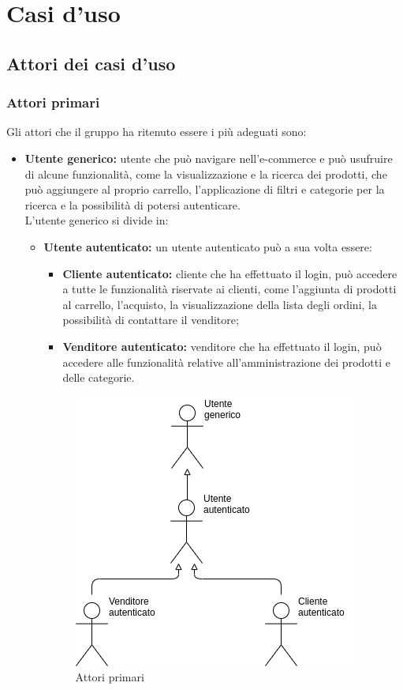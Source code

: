 \section{Casi d'uso}
\subsection{Attori dei casi d'uso}
\subsubsection{Attori primari}
Gli attori che il gruppo ha ritenuto essere i più adeguati sono:
\begin{itemize}
    \item \textbf{Utente generico:} utente che può navigare nell'e-commerce e può usufruire di alcune funzionalità, come la visualizzazione e la ricerca dei prodotti, che può aggiungere al proprio carrello, l'applicazione di filtri e categorie per la ricerca e la possibilità di potersi autenticare.\\ L'utente generico si divide in:
          \begin{itemize}
              \item \textbf{Utente autenticato:} un utente autenticato può a sua volta essere:
                    \begin{itemize}
                        \item \textbf{Cliente autenticato:} cliente che ha effettuato il login, può accedere a tutte le funzionalità riservate ai clienti, come l'aggiunta di prodotti al carrello, l'acquisto, la visualizzazione della lista degli ordini, la possibilità di contattare il venditore;
                        \item \textbf{Venditore autenticato:} venditore che ha effettuato il login, può accedere alle funzionalità relative all'amministrazione dei prodotti e delle categorie.
                    \end{itemize}
                    \begin{figure}[!ht]
                        \caption{Attori primari}
                        \vspace{5px}
                        \includegraphics[scale=0.6]{../../../Images/AnalisiRequisiti/attori}
                        \centering
                    \end{figure}
          \end{itemize}
\end{itemize}

